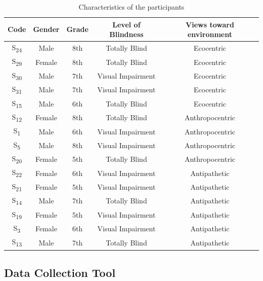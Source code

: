 \documentclass[11.5pt]{sig-alternate} %
\begin{document}
\begin{large}
\begin{table}[th]
\caption{Characteristics of the participants}
\begin{tabular}{ccccc}
\hline
\textbf{Code} & \textbf{Gender} & \textbf{Grade} & \textbf{Level of Blindness} & \textbf{Views toward environment} \\ \hline
S\textsubscript{24} & Male & 8th & Totally Blind & Ecocentric \\ \hline
S\textsubscript{29} & Female & 8th & Totally Blind & Ecocentric \\ \hline
S\textsubscript{30} & Male & 7th & Visual Impairment & Ecocentric \\ \hline
S\textsubscript{31} & Male & 7th & Visual Impairment & Ecocentric \\ \hline
S\textsubscript{15} & Male & 6th & Totally Blind & Ecocentric \\ \hline
S\textsubscript{12} & Female & 8th & Totally Blind & Anthropocentric \\ \hline
S\textsubscript{1} & Male & 6th & Visual Impairment & Anthropocentric \\ \hline
S\textsubscript{5} & Male & 8th & Visual Impairment & Anthropocentric \\ \hline
S\textsubscript{20} & Female & 5th & Totally Blind & Anthropocentric \\ \hline
S\textsubscript{22} & Female & 6th & Visual Impairment & Antipathetic \\ \hline
S\textsubscript{21} & Female & 5th & Visual Impairment & Antipathetic \\ \hline
S\textsubscript{14} & Male & 7th & Totally Blind & Antipathetic \\ \hline
S\textsubscript{19} & Female & 5th & Visual Impairment & Antipathetic \\ \hline
S\textsubscript{3} & Female & 6th & Visual Impairment & Antipathetic \\ \hline
S\textsubscript{13} & Male & 7th & Totally Blind & Antipathetic \\ \hline
\end{tabular}
\end{table}

\subsection*{Data Collection Tool}


\end{large}
\end{document}
